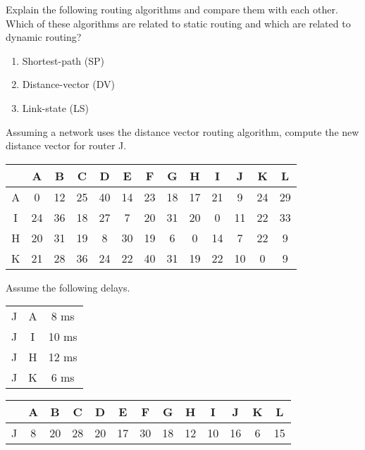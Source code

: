\documentclass[12pt, oneside]{book}
\begin{document}
\begin{Exercise}
Explain the following routing algorithms and compare them with each other. Which of these algorithms are related to static routing and which are related to dynamic routing?

\begin{enumerate}
    \item Shortest-path (SP)
    \item Distance-vector (DV)
    \item Link-state (LS)
\end{enumerate}
\end{Exercise}

\begin{Exercise}
\end{Exercise}

\begin{Exercise}
\end{Exercise}

\begin{Exercise}
Assuming a network uses the distance vector routing algorithm, compute the new distance vector for router J.

\begin{center}
\begin{tabular}{c|c|c|c|c|c|c|c|c|c|c|c|c}
      & A & B & C & D & E & F & G & H & I & J & K & L \\ \hline
    A & 0 & 12 & 25 & 40 & 14 & 23 & 18 & 17 & 21 & 9 & 24 & 29 \\
    I & 24 & 36 & 18 & 27 & 7 & 20 & 31 & 20 & 0 & 11 & 22 & 33 \\
    H & 20 & 31 & 19 & 8 & 30 & 19 & 6 & 0 & 14 & 7 & 22 & 9 \\
    K & 21 & 28 & 36 & 24 & 22 & 40 & 31 & 19 & 22 & 10 & 0 & 9
\end{tabular}
\end{center}

Assume the following delays.

\begin{center}
\begin{tabular}{c|c|c}
    J & A &  8 ms \\
    J & I & 10 ms \\
    J & H & 12 ms \\
    J & K &  6 ms
\end{tabular}
\end{center}
\end{Exercise}
\begin{Answer}
\begin{center}
\begin{tabular}{c|c|c|c|c|c|c|c|c|c|c|c|c}
      & A & B & C & D & E & F & G & H & I & J & K & L \\ \hline
    J & 8 & 20 & 28 & 20 & 17 & 30 & 18 & 12 & 10 & 16 & 6 & 15
\end{tabular}
\end{center}
\end{Answer}
\end{document}
